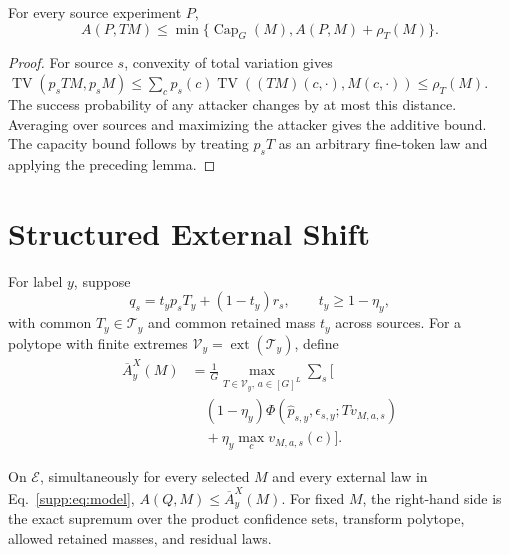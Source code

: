 \begin{lemma}
For every source experiment $P$,
\begin{equation}
 A(P,TM)\leq
 \min\{\operatorname{Cap}_G(M),A(P,M)+\rho_T(M)\}.
 \label{supp:eq:transfer}
\end{equation}
\end{lemma}

\begin{proof}
For source $s$, convexity of total variation gives
$\operatorname{TV}(p_sTM,p_sM)\leq
\sum_cp_s(c)\operatorname{TV}((TM)(c,\cdot),M(c,\cdot))\leq\rho_T(M)$.
The success probability of any attacker changes by at most this distance.
Averaging over sources and maximizing the attacker gives the additive bound.
The capacity bound follows by treating $p_sT$ as an arbitrary fine-token law
and applying the preceding lemma.
\end{proof}

\section{Structured External Shift}

For label $y$, suppose
\begin{equation}
 q_s=t_yp_sT_y+(1-t_y)r_s,
 \qquad t_y\geq1-\eta_y,
 \label{supp:eq:model}
\end{equation}
with common $T_y\in\mathcal T_y$ and common retained mass $t_y$ across sources.
For a polytope with finite extremes
$\mathcal V_y=\operatorname{ext}(\mathcal T_y)$, define
\begin{equation}
 \begin{aligned}
 \overline A_y^X(M)
 &=\frac1G\max_{T\in\mathcal V_y,\,a\in[G]^L}\sum_s\Big[
 \\[-2pt]&\quad (1-\eta_y)
 \Phi(\widehat p_{s,y},\epsilon_{s,y};Tv_{M,a,s})
 \\[-2pt]&\quad +\eta_y\max_cv_{M,a,s}(c)\Big].
 \end{aligned}
 \label{supp:eq:exactconfidence}
\end{equation}

\begin{theorem}
On $\mathcal E$, simultaneously for every selected $M$ and every external law
in Eq.~\eqref{supp:eq:model}, $A(Q,M)\leq\overline A_y^X(M)$. For fixed $M$,
the right-hand side is the exact supremum over the product confidence sets,
transform polytope, allowed retained masses, and residual laws.
\end{theorem}


